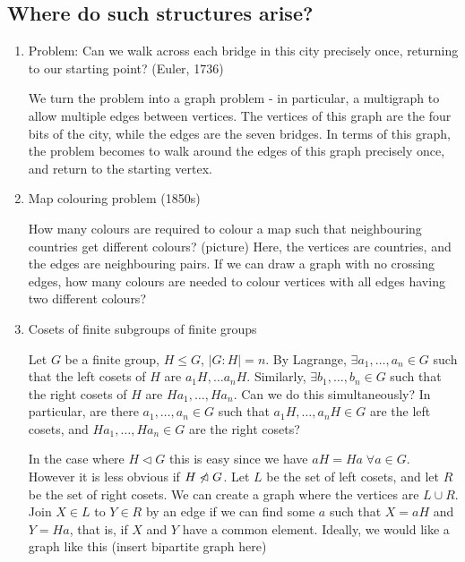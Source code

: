\documentclass{article}
\begin{document}
\subsection{Where do such structures arise?}

\begin{eg}
    \leavevmode
    \begin{enumerate}[label=\arabic*.]
        \item Problem: Can we walk across each bridge in this city precisely once, returning to our starting point? (Euler, 1736)

            We turn the problem into a graph problem - in particular, a multigraph to allow multiple edges between vertices.  The vertices of this graph are the four bits of the city, while the edges are the seven bridges.
            In terms of this graph, the problem becomes to walk around the edges of this graph precisely once, and return to the starting vertex.

        \item Map colouring problem (1850s)

            How many colours are required to colour a map such that neighbouring countries get different colours?
            (picture)
            Here, the vertices are countries, and the edges are neighbouring pairs.  If we can draw a graph with no crossing edges, how many colours are needed to colour vertices with all edges having two different colours?

        \item Cosets of finite subgroups of finite groups

            Let $G$ be a finite group, $H \leq G$, $|G : H| = n$.  By Lagrange, $\exists a_1, \dots, a_n \in G$ such that the left cosets of $H$ are $a_1 H, \dots a_n H$.
            Similarly, $\exists b_1, \dots, b_n \in G$ such that the right cosets of $H$ are $H a_1, \dots, H a_n$.
            Can we do this simultaneously? In particular, are there $a_1, \dots, a_n \in G$ such that $a_1 H, \dots, a_n H \in G$ are the left cosets, and $H a_1, \dots, H a_n \in G$ are the right cosets?

            In the case where $H \lhd G$ this is easy since we have $a H = H a \; \forall a \in G$.  However it is less obvious if $H \centernot\lhd G$.
            Let $L$ be the set of left cosets, and let $R$ be the set of right cosets. We can create a graph where the vertices are $L \cup R$.
            Join $X \in L$ to $Y \in R$ by an edge if we can find some $a$ such that $X = aH$ and $Y = Ha$, that is, if $X$ and $Y$ have a common element.  Ideally, we would like a graph like this
            (insert bipartite graph here)


\end{enumerate}
\end{eg}
\end{document}
